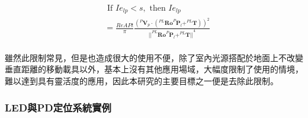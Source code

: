 \begin{description}
            \begin{equation}
                \label{eqn:model_parallel_restrict}
                \begin{aligned}
                    &\text { If } Ie_{lp}<s ,\text{ then }Ie_{lp} \\
                        &= \frac{ReAPt}{ \pi}
                    \frac{
                            {( ^{P}\boldsymbol{V}_p \cdot 
                                (
                                    ^{PL} \boldsymbol{Ro}^{P}\boldsymbol{P}_l
                                    + ^{PL}\boldsymbol{T}
                                )
                            )}^2
                     } 
                        {
                            {
                                ||
                                    ^{PL}\boldsymbol{Ro}^{P}\boldsymbol{P}_l+^{PL}\boldsymbol{T}
                                ||
                            }^{4}
                        }\\
                \end{aligned}
            \end{equation}

            \qquad
            雖然此限制常見，但是也造成很大的使用不便，除了室內光源搭配於地面上不改變垂直距離的移動載具以外，基本上沒有其他應用場域，大幅度限制了使用的情境，難以達到具有靈活度的應用，因此本研究的主要目標之一便是去除此限制。
     

        \end{description}
        


    \subsubsection{LED與PD定位系統實例}
    \label{chp:LEDPD_case}

